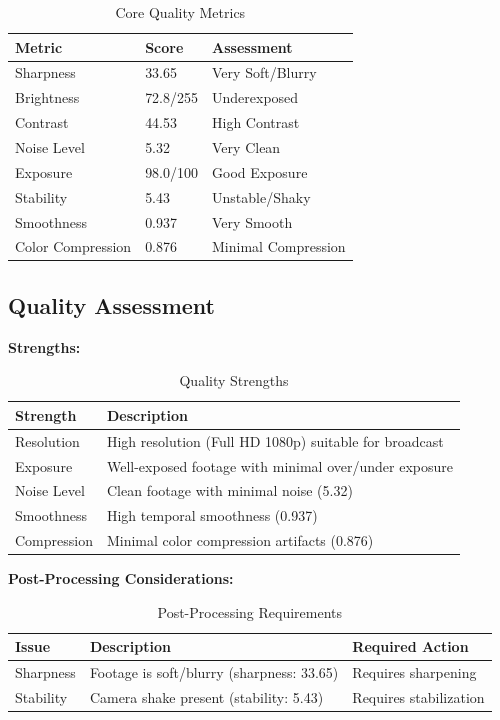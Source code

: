 \documentclass[
  11pt,
]{article}
\begin{document}
\begin{table}[h]
\centering
\small
\caption{Core Quality Metrics}
\label{tab-quality-metrics}
\begin{tabular}{p{3.5cm}p{2cm}p{5.5cm}}
\toprule
\textbf{Metric} & \textbf{Score} & \textbf{Assessment} \\
\midrule
Sharpness & 33.65 & Very Soft/Blurry \\
Brightness & 72.8/255 & Underexposed \\
Contrast & 44.53 & High Contrast \\
Noise Level & 5.32 & Very Clean \\
Exposure & 98.0/100 & Good Exposure \\
Stability & 5.43 & Unstable/Shaky \\
Smoothness & 0.937 & Very Smooth \\
Color Compression & 0.876 & Minimal Compression \\
\bottomrule
\end{tabular}
\end{table}

\needspace{12cm}
\subsection{Quality Assessment}

\textbf{Strengths:}

\begin{table}[h]
\centering
\small
\caption{Quality Strengths}
\label{tab-strengths}
\begin{tabular}{p{2cm}p{7cm}}
\toprule
\textbf{Strength} & \textbf{Description} \\
\midrule
Resolution & High resolution (Full HD 1080p) suitable for broadcast \\
Exposure & Well-exposed footage with minimal over/under exposure \\
Noise Level & Clean footage with minimal noise (5.32) \\
Smoothness & High temporal smoothness (0.937) \\
Compression & Minimal color compression artifacts (0.876) \\
\bottomrule
\end{tabular}
\end{table}

\textbf{Post-Processing Considerations:}

\begin{table}[h]
\centering
\small
\caption{Post-Processing Requirements}
\label{tab-post-processing}
\begin{tabular}{p{2cm}p{4cm}p{3cm}}
\toprule
\textbf{Issue} & \textbf{Description} & \textbf{Required Action} \\
\midrule
Sharpness & Footage is soft/blurry (sharpness: 33.65) & Requires sharpening \\
Stability & Camera shake present (stability: 5.43) & Requires stabilization \\
\bottomrule
\end{tabular}
\end{table}
\end{document}
